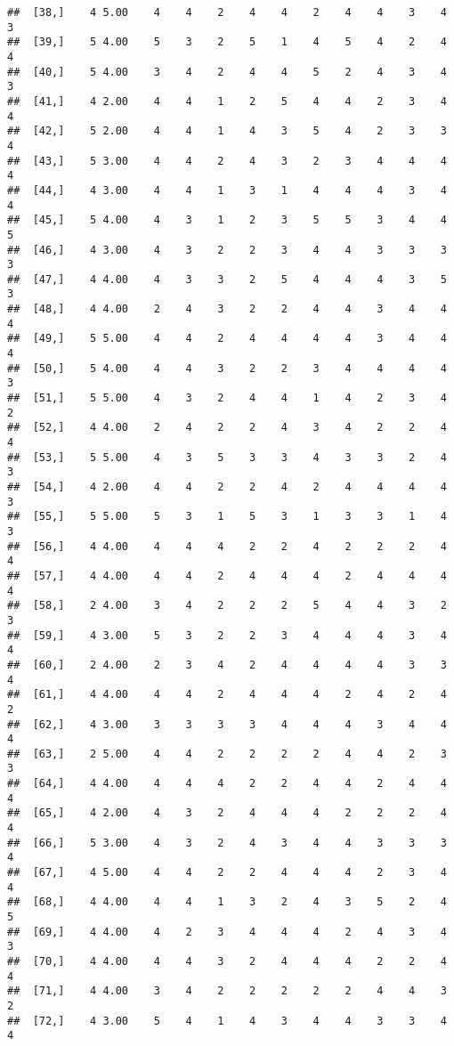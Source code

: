 \documentclass[]{article}
\begin{document}
\begin{verbatim}
##  [38,]    4 5.00    4    4    2    4    4    2    4    4    3    4    3
##  [39,]    5 4.00    5    3    2    5    1    4    5    4    2    4    4
##  [40,]    5 4.00    3    4    2    4    4    5    2    4    3    4    3
##  [41,]    4 2.00    4    4    1    2    5    4    4    2    3    4    4
##  [42,]    5 2.00    4    4    1    4    3    5    4    2    3    3    4
##  [43,]    5 3.00    4    4    2    4    3    2    3    4    4    4    4
##  [44,]    4 3.00    4    4    1    3    1    4    4    4    3    4    4
##  [45,]    5 4.00    4    3    1    2    3    5    5    3    4    4    5
##  [46,]    4 3.00    4    3    2    2    3    4    4    3    3    3    3
##  [47,]    4 4.00    4    3    3    2    5    4    4    4    3    5    3
##  [48,]    4 4.00    2    4    3    2    2    4    4    3    4    4    4
##  [49,]    5 5.00    4    4    2    4    4    4    4    3    4    4    4
##  [50,]    5 4.00    4    4    3    2    2    3    4    4    4    4    3
##  [51,]    5 5.00    4    3    2    4    4    1    4    2    3    4    2
##  [52,]    4 4.00    2    4    2    2    4    3    4    2    2    4    4
##  [53,]    5 5.00    4    3    5    3    3    4    3    3    2    4    3
##  [54,]    4 2.00    4    4    2    2    4    2    4    4    4    4    3
##  [55,]    5 5.00    5    3    1    5    3    1    3    3    1    4    3
##  [56,]    4 4.00    4    4    4    2    2    4    2    2    2    4    4
##  [57,]    4 4.00    4    4    2    4    4    4    2    4    4    4    4
##  [58,]    2 4.00    3    4    2    2    2    5    4    4    3    2    3
##  [59,]    4 3.00    5    3    2    2    3    4    4    4    3    4    4
##  [60,]    2 4.00    2    3    4    2    4    4    4    4    3    3    4
##  [61,]    4 4.00    4    4    2    4    4    4    2    4    2    4    2
##  [62,]    4 3.00    3    3    3    3    4    4    4    3    4    4    4
##  [63,]    2 5.00    4    4    2    2    2    2    4    4    2    3    3
##  [64,]    4 4.00    4    4    4    2    2    4    4    2    4    4    4
##  [65,]    4 2.00    4    3    2    4    4    4    2    2    2    4    4
##  [66,]    5 3.00    4    3    2    4    3    4    4    3    3    3    4
##  [67,]    4 5.00    4    4    2    2    4    4    4    2    3    4    4
##  [68,]    4 4.00    4    4    1    3    2    4    3    5    2    4    5
##  [69,]    4 4.00    4    2    3    4    4    4    2    4    3    4    3
##  [70,]    4 4.00    4    4    3    2    4    4    4    2    2    4    4
##  [71,]    4 4.00    3    4    2    2    2    2    2    4    4    3    2
##  [72,]    4 3.00    5    4    1    4    3    4    4    3    3    4    4

\end{verbatim}
\end{document}
